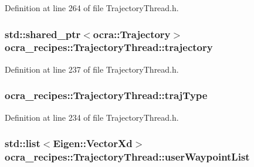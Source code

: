 Definition at line 264 of file Trajectory\+Thread.\+h.

\subsubsection[{\texorpdfstring{trajectory}{trajectory}}]{\setlength{\rightskip}{0pt plus 5cm}std\+::shared\+\_\+ptr$<${\bf ocra\+::\+Trajectory}$>$ ocra\+\_\+recipes\+::\+Trajectory\+Thread\+::trajectory\hspace{0.3cm}{\ttfamily [protected]}}\hypertarget{classocra__recipes_1_1TrajectoryThread_a87ec388c22716d82bca31dbf89a21cb3}{}\label{classocra__recipes_1_1TrajectoryThread_a87ec388c22716d82bca31dbf89a21cb3}


Definition at line 237 of file Trajectory\+Thread.\+h.

\subsubsection[{\texorpdfstring{traj\+Type}{trajType}}]{ ocra\+\_\+recipes\+::\+Trajectory\+Thread\+::traj\+Type\hspace{0.3cm}{\ttfamily [protected]}}\hypertarget{classocra__recipes_1_1TrajectoryThread_a1ed2999782ff98b02b5d99ac66766cd7}{}\label{classocra__recipes_1_1TrajectoryThread_a1ed2999782ff98b02b5d99ac66766cd7}


Definition at line 234 of file Trajectory\+Thread.\+h.

\subsubsection[{\texorpdfstring{user\+Waypoint\+List}{userWaypointList}}]{\setlength{\rightskip}{0pt plus 5cm}std\+::list$<$Eigen\+::\+Vector\+Xd$>$ ocra\+\_\+recipes\+::\+Trajectory\+Thread\+::user\+Waypoint\+List\hspace{0.3cm}{\ttfamily [protected]}}\hypertarget{classocra__recipes_1_1TrajectoryThread_ab0d6ab656c8e4c7abd3bae0343b51562}{}\label{classocra__recipes_1_1TrajectoryThread_ab0d6ab656c8e4c7abd3bae0343b51562}


